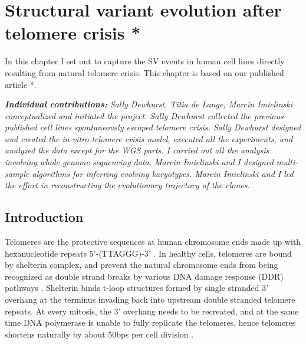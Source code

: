 \documentclass[phd,tocprelim]{cornell}
\begin{document}
\chapter{Structural variant evolution after telomere crisis *} \label{chap:tel_crisis} 
In this chapter I set out to capture the SV events in human cell lines directly resulting from natural telomere crisis. This chapter is based on our published article \cite{Dewhurst2021-jk}*.

\textit{\textbf{Individual contributions:} Sally Dewhurst, Titia de Lange, Marcin Imielinski conceptualized and initiated the project. Sally Dewhurst collected the previous published cell lines spontaneously escaped telomere crisis. Sally Dewhurst designed and created the \textit{in vitro} telomere crisis model, executed all the experiments, and analyzed the data except for the WGS parts. I carried out all the analysis involving whole genome sequencing data. Marcin Imielinski and I designed multi-sample algorithms for inferring evolving karyotypes. Marcin Imielinski and I led the effort in reconstructing the evolutionary trajectory of the clones.}


\section{Introduction}
Telomeres are the protective sequences at human chromosome ends made up with hexanucleotide repeats 5'-(TTAGGG)-3' \cite{De_Lange1990-mz}. In healthy cells, telomeres are bound by shelterin complex, and prevent the natural chromosome ends from being recognized as double strand breaks by various DNA damage response (DDR) pathways \cite{De_Lange2005-cn}. Shelterin binds t-loop structures formed by single stranded 3' overhang at the terminus invading back into upstream double stranded telomere repeats. At every mitosis, the 3' overhang needs to be recreated, and at the same time DNA polymerase is unable to fully replicate the telomeres, hence telomeres shortens naturally by about 50bps per cell division \cite{De_Lange2005-cn}. 
\end{document}
